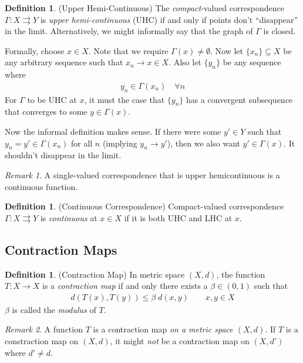 \documentclass[12pt]{article}
\numberwithin{equation}{section} %
\theoremstyle{plain}
\theoremstyle{definition}
\newtheorem{defn}[thm]{Definition}
\theoremstyle{remark}
\newtheorem*{rmk}{Remark}
\newcommand{\ra}{\rightarrow}
\begin{document}
\begin{defn}{(Upper Hemi-Continuous)}
The \emph{compact}-valued correspondence $\Gamma:X\rightrightarrows Y$
is \emph{upper hemi-continuous} (UHC) if and only if points don't
``disappear'' in the limit. Alternatively, we might informally say that
the graph of $\Gamma$ is closed.

Formally, choose $x\in X$. Note that we require
$\Gamma(x)\neq\emptyset$. Now let $\{x_n\}\subseteq X$ be any arbitrary
sequence such that $x_n\ra x\in X$. Also let $\{y_n\}$ be any sequence
where
\begin{align*}
  y_n \in \Gamma(x_n) \quad\forall n
\end{align*}
For $\Gamma$ to be UHC at $x$, it must the case that $\{y_n\}$ has a
convergent subsequence that converges to some $y\in \Gamma(x)$.

Now the informal definition makes sense. If there were some $y'\in Y$
such that $y_n = y' \in \Gamma(x_n)$ for all $n$ (implying
$y_n\rightarrow y'$), then we also want $y'\in \Gamma(x)$. It shouldn't
disappear in the limit.
\end{defn}
\begin{rmk}
A single-valued correspondence that is upper hemicontinuous is a
continuous function.
\end{rmk}

\begin{defn}{(Continuous Correspondence)}
Compact-valued correspondence $\Gamma:X\rightrightarrows Y$ is
\emph{continuous} at $x\in X$ if it is both UHC and LHC at $x$.
\end{defn}

\clearpage
\subsection{Contraction Maps}

\begin{defn}{(Contraction Map)}
In metric space $(X,d)$, the function $T: X\rightarrow X$ is a
\emph{contraction map} if and only there exists a $\beta \in (0,1)$ such
that
\begin{align*}
  d(T(x), T(y)) \leq \beta \; d(x,y)
  \qquad x,y\in X
\end{align*}
$\beta$ is called the \emph{modulus} of $T$.
\end{defn}
\begin{rmk}
A function $T$ is a contraction map \emph{on a metric space $(X,d)$}. If
$T$ is a constraction map on $(X,d)$, it might \emph{not}
be a contraction map on $(X,d')$ where $d'\neq d$.
\end{rmk}
\end{document}
